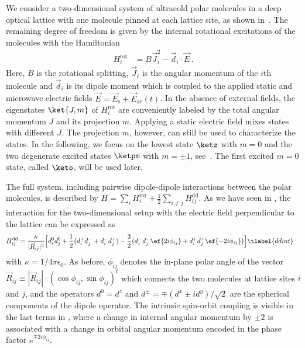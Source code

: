 
We consider a two-dimensional system of ultracold polar molecules in a deep optical lattice with one molecule pinned at each lattice site, as shown in~.
The remaining degree of freedom is given by the internal rotational excitations of the molecules with the Hamiltonian
\begin{align}
    H^{\text{rot}}_i &= B \vec{J}_i^2 - \vec{d}_i\cdot\vec{E}\,.
\end{align}
Here, $B$ is the rotational splitting, $\vec{J}_i$ is the angular momentum of the $i$th molecule and $\vec{d}_i$ is its dipole moment which is coupled to the applied static and microwave electric fields $\vec{E} = \vec{E}_{\text{s}} + \vec{E}_{\text{ac}}(t)$.
In the absence of external fields, the eigenstates $\ket{J,m}$ of $H^{\text{rot}}_{i}$ are conveniently labeled by the total angular momentum $J$ and its projection $m$.
Applying a static electric field mixes states with different $J$.
The projection $m$, however, can still be used to characterize the states.
In the following, we focus on the lowest state $\ketz$ with $m=0$ and the two degenerate excited states $\ketpm$ with $m = \pm 1$, see~.
The first excited $m=0$ state, called $\keto$, will be used later.

The full system, including pairwise dipole-dipole interactions between the polar mole\-cules, is described by $H=\sum_i H^{\text{rot}}_i + \frac{1}{2}\sum_{i\ne j}H^{\text{dd}}_{ij}$.
As we have seen in , the interaction for the two-dimensional setup with the electric field perpendicular to the lattice can be expressed as
\begin{align}
    H^{\text{dd}}_{ij}=\frac{\kappa}{|\vec{R}_{ij}|^3} &\Big[d^0_i d^0_j + \frac{1}{2}\big(d^+_i d^-_j + d^-_i d^+_j) - \frac{3}{2}\big(d^-_i d^-_j \ef{2i\phi_{ij}} + d^+_i d^+_j \ef{-2i\phi_{ij}}\big)\Big] \tlabel{ddint}
\end{align}
with $\kappa=1/4\pi\epsilon_0$.
As before, $\phi_{ij}$ denotes the in-plane polar angle of the vector $\vec{R}_{ij} \equiv |\vec{R}_{ij}| \cdot (\cos \phi_{ij}, \sin \phi_{ij})^t$ which connects the two molecules at lattice sites $i$ and $j$, and the operators $d^0=d^z$ and $d^\pm=\mp (d^x\pm i d^y)/\sqrt{2}$ are the spherical components of the dipole operator.
The intrinsic spin-orbit coupling is visible in the last terms in , where a change in internal angular momentum by $\pm 2$ is associated with a change in orbital angular momentum encoded in the phase factor $e^{\mp 2i \phi_{ij}}$.

